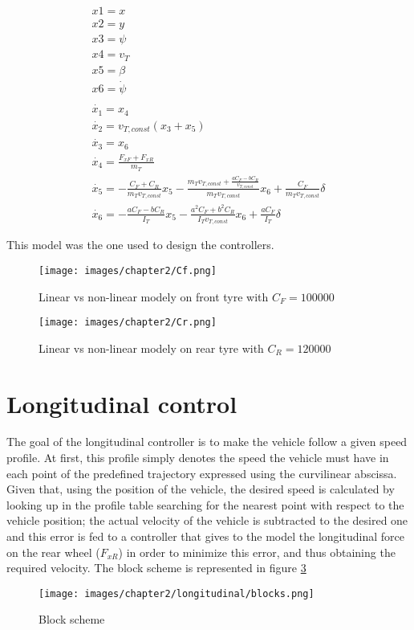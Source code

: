 \documentclass{report}
\let\Oldsection\section
\renewcommand{\section}{\FloatBarrier\Oldsection}
\begin{document}
\begin{equation}
\begin{aligned}
x1 = x\\
x2 = y\\
x3 = \psi\\
x4 = v_T\\
x5 = \beta\\
x6 = \dot{\psi}\\\\
\dot{x_1} = x_4\\
\dot{x_2} = v_{T, const} (x_3 + x_5)\\
\dot{x_3} = x_6 \\
\dot{x_4} = \frac{F_{xF} + F_{xR}}{m_T} \\
\dot{x_5} = - \frac{C_F + C_R}{m_T v_{T, const}}x_5 - \frac{m_T v_{T, const} + \frac{aC_F - bC_R}{v_{T, const}}}{m_T v_{T, const}}x_6 + \frac{C_F}{m_T v_{T, const}}\delta\\
\dot{x_6} = - \frac{aC_F - bC_R}{I_T}x_5 - \frac{a^2 C_F + b^2 C_R}{I_T v_{T, const}}x_6 + \frac{a C_F}{I_T }\delta\\\\
\end{aligned}
\end{equation}
This model was the one used to design the controllers.

\begin{figure}[h!]
    \centering
    \texttt{[image: images/chapter2/Cf.png]}
    \caption{Linear vs non-linear modely on front tyre with $C_F = 100000$}
    \label{fig:Cf}
\end{figure}

\begin{figure}[h!]
    \centering
    \texttt{[image: images/chapter2/Cr.png]}
    \caption{Linear vs non-linear modely on rear tyre with $C_R = 120000$}
    \label{fig:Cr}
\end{figure}



\section{Longitudinal control}
The goal of the longitudinal controller is to make the vehicle follow a given speed profile. At first, this profile simply denotes the speed the vehicle must have in each point of the predefined trajectory expressed using the curvilinear abscissa. Given that, using the position of the vehicle, the desired speed is calculated by looking up in the profile table searching for the nearest point with respect to the vehicle position; the actual velocity of the vehicle is subtracted to the desired one and this error is fed to a controller that gives to the model the longitudinal force on the rear wheel ($F_{xR}$) in order to minimize this error, and thus obtaining the required velocity. The block scheme is represented in figure \ref{fig:longController_blocks}
\begin{figure}[h!]
    \centering
    \texttt{[image: images/chapter2/longitudinal/blocks.png]}
    \caption{Block scheme}
    \label{fig:longController_blocks}
\end{figure}
\end{document}
